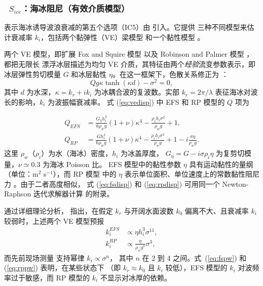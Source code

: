 \vsssub
\subsubsection{~$S_{ice}$：海冰阻尼（有效介质模型）} \label{sec:ICE5}
\vsssub


\noindent
表示海冰诱导波浪衰减的第五个选项（{\code IC5}）由 \citet{Liu2020} 引入。它提供
三种不同模型来估计衰减率 $k_i$，包括两个黏弹性（VE）梁模型 \citep{art:MMS15}
和一个黏性模型 \citep{Meylan2018}。

两个 VE 模型，即扩展 Fox and Squire 模型 \citep[下文称 EFS 模型；另见][]{art:FS1994}
以及 Robinson and Palmer 模型 \citep[][下文称 RP 模型]{Robinson1990}，都把无限长
漂浮冰层描述为均匀 VE 介质，其特征由两个\emph{经验}流变参数表示，即冰层弹性剪切模量
$G$ 和冰层黏性 $\eta$。在这一框架下，色散关系修正为 \citep{art:MMS15}：
\begin{equation}
Q g \kappa \tanh(\kappa d)-\sigma^2 = 0,
\label{eq:vedisp}
\end{equation}
其中 $d$ 为水深，$\kappa = k_r + i k_i$ 为冰耦合波的复波数。实部
$k_r = 2\pi / \lambda$ 表征海冰对波长的影响，$k_i$ 为波振幅衰减率。
式 (\ref{eq:vedisp}) 中 EFS 和 RP 模型的 $Q$ 项为

\begin{align}
Q_{EFS} &= \frac{G_{\eta} h_i^3}{6 \rho_w g} (1+\nu) \kappa^4 - \frac{\rho_i h_i \sigma^2}{\rho_w g} + 1,\label{eq:fsdisp}\\
%
Q_{RP}  &= \frac{G h_i^3}{6 \rho_w g} (1+\nu) \kappa^4 - \frac{\rho_i h_i \sigma^2}{\rho_w g} + 1 - i \frac{\sigma \eta}{\rho_w g}.\label{eq:rpdisp}
\end{align}
这里 $\rho_w$（$\rho_i$）为水（海冰）密度，$h_i$ 为冰盖厚度，
$G_{\eta}=G- i \sigma \rho_i \eta$ 为复剪切模量，$\nu \simeq 0.3$ 为海冰 Poisson 比。
EFS 模型中的黏性参数 $\eta$ 具有运动黏性的量纲（单位：m$^2$ s$^{-1}$），而 RP 模型
中的 $\eta$ 表示单位面积、单位速度上的常数黏性阻尼力
\citep[单位：kg m$^{-2}$ s$^{-1}$；][]{Meylan2018}。由于二者高度相似，
式 (\ref{eq:fsdisp}) 和 (\ref{eq:rpdisp}) 可用同一个 Newton-Raphson 迭代求解器计算
\citep[见][]{Liu2020} 的附录。

通过详细理论分析，\citet{Meylan2018} 指出，在假定 $k_r$ 与开阔水面波数 $k_0$
偏离不大、且衰减率 $k_i$ 较弱时，上述两个 VE 模型预报
\begin{align}
k_i^{EFS} &\propto \eta h_i^3 \sigma^{11},\label{eq:fspw}\\ k_i^{RP} &\propto \frac{\eta}{\rho_w g^2} \sigma^3,\label{eq:rppw}
\end{align}
而先前现场测量 \citep[e.g.,][]{Meylan2018, RMK21} 支持幂律 $k_i \propto \sigma^n$，
其中 $n$ 在 2 到 4 之间。式~(\ref{eq:fspw}) 和 (\ref{eq:rppw}) 表明，在某些状态下
（即 $k_r \approx k_0$ 且 $k_i$ 较低），EFS 模型的 $k_i$ 对波频率过于敏感，而 RP
模型的 $k_i$ 不显示对冰厚的依赖。

